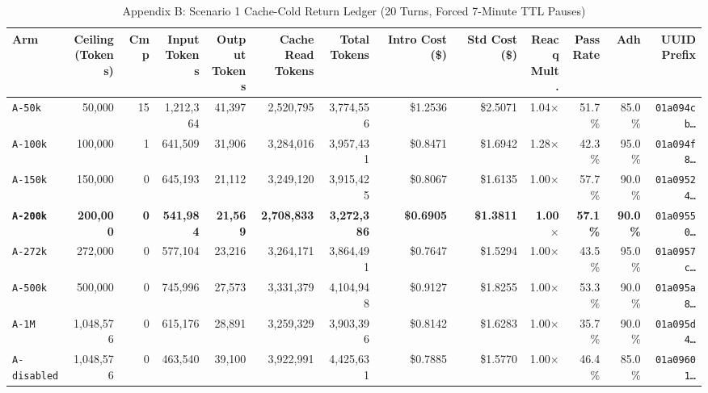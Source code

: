 \documentclass[10pt,twocolumn,a4paper]{article}
\begin{document}
\begin{table}[t]
\caption{Appendix B: Scenario 1 Cache-Cold Return Ledger (20 Turns, Forced 7-Minute TTL Pauses)}
\label{tab:app_scenario1_ledger}
\centering
\scriptsize
\setlength{\tabcolsep}{2.2pt}
\begin{tabular}{@{}lrrrrrrrrrrrr@{}}
\toprule
\textbf{Arm} & \shortstack{\textbf{Ceiling}\\\textbf{(Tokens)}} & \textbf{Cmp} & \shortstack{\textbf{Input}\\\textbf{Tokens}} & \shortstack{\textbf{Output}\\\textbf{Tokens}} & \shortstack{\textbf{Cache Read}\\\textbf{Tokens}} & \shortstack{\textbf{Total}\\\textbf{Tokens}} & \shortstack{\textbf{Intro Cost}\\\textbf{(\$)}} & \shortstack{\textbf{Std Cost}\\\textbf{(\$)}} & \shortstack{\textbf{Reacq}\\\textbf{Mult.}} & \shortstack{\textbf{Pass}\\\textbf{Rate}} & \textbf{Adh} & \shortstack{\textbf{UUID}\\\textbf{Prefix}} \\
\midrule
\texttt{A-50k} & 50,000 & 15 & 1,212,364 & 41,397 & 2,520,795 & 3,774,556 & \$1.2536 & \$2.5071 & 1.04$\times$ & 51.7\% & 85.0\% & \texttt{01a094cb\dots} \\
\texttt{A-100k} & 100,000 & 1 & 641,509 & 31,906 & 3,284,016 & 3,957,431 & \$0.8471 & \$1.6942 & 1.28$\times$ & 42.3\% & 95.0\% & \texttt{01a094f8\dots} \\
\texttt{A-150k} & 150,000 & 0 & 645,193 & 21,112 & 3,249,120 & 3,915,425 & \$0.8067 & \$1.6135 & 1.00$\times$ & 57.7\% & 90.0\% & \texttt{01a09524\dots} \\
\textbf{\texttt{A-200k}} & \textbf{200,000} & \textbf{0} & \textbf{541,984} & \textbf{21,569} & \textbf{2,708,833} & \textbf{3,272,386} & \textbf{\$0.6905} & \textbf{\$1.3811} & \textbf{1.00$\times$} & \textbf{57.1\%} & \textbf{90.0\%} & \texttt{01a09550\dots} \\
\texttt{A-272k} & 272,000 & 0 & 577,104 & 23,216 & 3,264,171 & 3,864,491 & \$0.7647 & \$1.5294 & 1.00$\times$ & 43.5\% & 95.0\% & \texttt{01a0957c\dots} \\
\texttt{A-500k} & 500,000 & 0 & 745,996 & 27,573 & 3,331,379 & 4,104,948 & \$0.9127 & \$1.8255 & 1.00$\times$ & 53.3\% & 90.0\% & \texttt{01a095a8\dots} \\
\texttt{A-1M} & 1,048,576 & 0 & 615,176 & 28,891 & 3,259,329 & 3,903,396 & \$0.8142 & \$1.6283 & 1.00$\times$ & 35.7\% & 90.0\% & \texttt{01a095d4\dots} \\
\texttt{A-disabled} & 1,048,576 & 0 & 463,540 & 39,100 & 3,922,991 & 4,425,631 & \$0.7885 & \$1.5770 & 1.00$\times$ & 46.4\% & 85.0\% & \texttt{01a09601\dots} \\
\bottomrule
\end{tabular}
\end{table}
\end{document}

